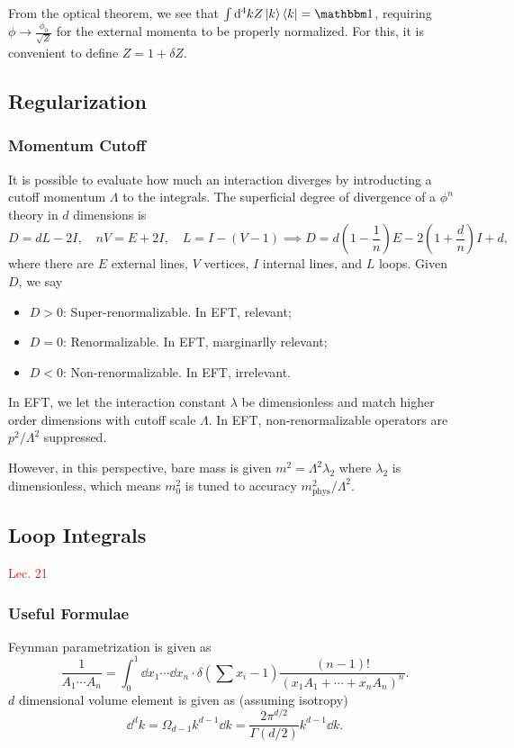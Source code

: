 \documentclass{article}
\begin{document}
From the optical theorem, we see that $\int \dd^4kZ\ket k\bra k=\mathbbm 1$, requiring $\phi\to\frac{\phi_0}{\sqrt Z}$ for the external momenta to be properly normalized. For this, it is convenient to define $Z=1+\delta Z$. 

\subsection{Regularization}
\subsubsection{Momentum Cutoff}
It is possible to evaluate how much an interaction diverges by introducting a cutoff momentum $\Lambda$ to the integrals. The superficial degree of divergence of a $\phi^n$ theory in $d$ dimensions is 
$$D=dL-2I,\quad nV=E+2I,\quad L=I-(V-1)\implies D=d\left(1-\frac 1n\right)E-2\left(1+\frac dn\right)I+d,$$
where there are $E$ external lines, $V$ vertices, $I$ internal lines, and $L$ loops. Given $D$, we say
\begin{itemize}
    \item $D>0$: Super-renormalizable. In EFT, relevant;
    \item $D=0$: Renormalizable. In EFT, marginarlly relevant;
    \item $D<0$: Non-renormalizable. In EFT, irrelevant.
\end{itemize}
In EFT, we let the interaction constant $\lambda$ be dimensionless and match higher order dimensions with cutoff scale $\Lambda$. In EFT, non-renormalizable operators are $p^2/\Lambda^2$ suppressed. 

However, in this perspective, bare mass is given $m^2=\Lambda^2\lambda_2$ where $\lambda_2$ is dimensionless, which means $m_0^2$ is tuned to accuracy $m^2_\text{phys}/\Lambda^2$.

\subsection{Loop Integrals}
\textcolor{red}{Lec. 21}
\subsubsection{Useful Formulae}
Feynman parametrization is given as 
\begin{equation}
    \frac 1{A_1\cdots A_n}=\int^1_0\dd x_1\cdots\dd x_n\cdot\delta\left(\sum x_i-1\right)\frac{(n-1)!}{\left(x_1A_1+\cdots+x_nA_n\right)^n}.
\end{equation}
$d$ dimensional volume element is given as (assuming isotropy)
\begin{equation}
    \dd^dk=\Omega_{d-1}k^{d-1}\dd k=\frac{2\pi^{d/2}}{\Gamma(d/2)}k^{d-1}\dd k.
\end{equation}
\end{document}
